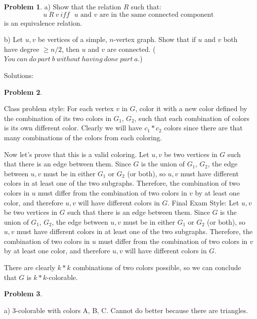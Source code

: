 \documentclass{amsart}
\theoremstyle{definition}
\newtheorem{problem}{Problem}
\theoremstyle{remark}
\begin{document}
\begin{problem}
a) Show that the relation $R$ such that: 
\[
u\ R\ v\ \text{$iff$ $u$ and $v$ are in the same connected component}
\]
is an equivalence relation.

b) Let $u,v$ be vertices of a simple, $n$-vertex graph.  Show that if $u$ and $v$ both have degree $\geq n/2$, then $u$ and $v$ are connected.  ($You\ can\ do\ part\ b\ without\ having\ done\ part\ a.$)
\end{problem}

\newpage
Solutions:
\setcounter{problem}{0}
\begin{problem}
\end{problem}
Class problem style:
For each vertex $v$ in $G$, color it with a new color defined by the combination of its two colors in $G_1$, $G_2$, such that each combination of colors is its own different color.  Clearly we will have $c_1 * c_2$ colors since there are that many combinations of the colors from each coloring.  

Now let's prove that this is a valid coloring.  Let $u,v$ be two vertices in $G$ such that there is an edge between them.  Since $G$ is the union of $G_1$, $G_2$, the edge between $u,v$ must be in either $G_1$ or $G_2$ (or both), so $u,v$ must have different colors in at least one of the two subgraphs.  Therefore, the combination of two colors in $u$ must differ from the combination of two colors in $v$ by at least one color, and therefore $u,v$ will have different colors in $G$.
\newline
\newline
Final Exam Style:
Let $u,v$ be two vertices in $G$ such that there is an edge between them.  Since $G$ is the union of $G_1$, $G_2$, the edge between $u,v$ must be in either $G_1$ or $G_2$ (or both), so $u,v$ must have different colors in at least one of the two subgraphs.  Therefore, the combination of two colors in $u$ must differ from the combination of two colors in $v$ by at least one color, and therefore $u,v$ will have different colors in $G$.

There are clearly $k*k$ combinations of two colors possible, so we can conclude that $G$ is $k*k$-colorable.

\begin{problem}
\end{problem}
a) 3-colorable with colors A, B, C. Cannot do better because there are triangles.
\end{document}
